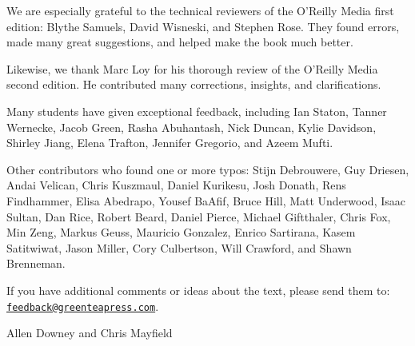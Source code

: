 We are especially grateful to the technical reviewers of the O'Reilly Media first edition: Blythe Samuels, David Wisneski, and Stephen Rose.
They found errors, made many great suggestions, and helped make the book much better.

Likewise, we thank Marc Loy for his thorough review of the O'Reilly Media second edition.
He contributed many corrections, insights, and clarifications.

Many students have given exceptional feedback, including Ian Staton, Tanner Wernecke, Jacob Green, Rasha Abuhantash, Nick Duncan, Kylie Davidson, Shirley Jiang, Elena Trafton, Jennifer Gregorio, and Azeem Mufti.

Other contributors who found one or more typos: Stijn Debrouwere, Guy Driesen, Andai Velican, Chris Kuszmaul, Daniel Kurikesu, Josh Donath, Rens Findhammer, Elisa Abedrapo, Yousef BaAfif, Bruce Hill, Matt Underwood, Isaac Sultan, Dan Rice, Robert Beard, Daniel Pierce, Michael Giftthaler, Chris Fox, Min Zeng, Markus Geuss, Mauricio Gonzalez, Enrico Sartirana, Kasem Satitwiwat, Jason Miller, Cory Culbertson, Will Crawford, and Shawn Brenneman.


If you have additional comments or ideas about the text, please send them to: \href{mailto:feedback@greenteapress.com}{\tt feedback@greenteapress.com}.

\hfill Allen Downey and Chris Mayfield
